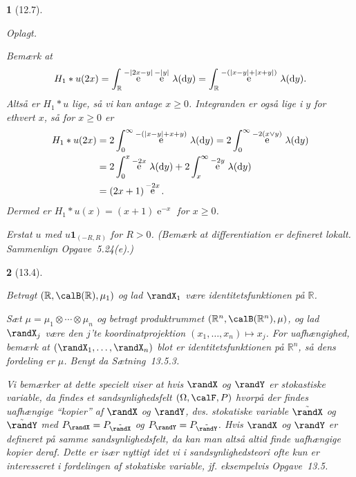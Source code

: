 \documentclass[a4paper, 11pt, article, danish, oneside]{memoir}
\newcommand{\reals}{\mathbb{R}}
\newcommand{\blank}{\mathrel{\;\cdot\;}}
\newcommand{\blankifempty}[1]{\ifstrempty{#1}{\blank}{#1}}
\DeclarePairedDelimiter{\auxdelimlvert}{\lvert}{\rvert}
\newcommand{\abs}[2][]{\auxdelimlvert[#1]{\blankifempty{#2}}}
\DeclarePairedDelimiter{\auxdelimparen}{(}{)}
\newcommand{\borel}[2][]{\calB\auxdelimparen[#1]{#2}}
\newcommand{\dif}{\mathop{}\!\mathrm{d}}
\newcommand{\indicator}[1]{\mathbf{1}_{#1}}
\newcommand{\join}{\lor}
\DeclareMathOperator{\e}{\mathrm{e}}
\newcommand{\pencilsymbol}{\raisebox{-2pt}{\normalfont\PencilLeft}}
\theoremstyle{changedotcustomnumber}
\theoremstyle{changedotbreakcustomnumber}
\newtheorem{opgavebreak}{\pencilsymbol}
\begin{document}
\begin{opgavebreak}[12.7]
\begin{solutionsec}
    \item Oplagt.

    \item Bemærk at
    \begin{equation*}
        H_1 * u(2x)
            = \int_\reals \e^{-\abs{2x-y}} \e^{-\abs{y}} \,\lambda(\dif y)
            = \int_\reals \e^{-(\abs{x-y}+\abs{x+y})} \,\lambda(\dif y).
    \end{equation*}
    Altså er $H_1 * u$ lige, så vi kan antage $x \geq 0$. Integranden er også lige i $y$ for ethvert $x$, så for $x \geq 0$ er
    \begin{align*}
        H_1 * u(2x)
            &= 2\int_0^\infty \e^{-(\abs{x-y}+x+y)} \,\lambda(\dif y)
             = 2\int_0^\infty \e^{-2(x \join y)} \,\lambda(\dif y) \\
            &= 2\int_0^x \e^{-2x} \,\lambda(\dif y) + 2\int_x^\infty \e^{-2y} \,\lambda(\dif y) \\
            &= (2x+1) \e^{-2x}.
    \end{align*}
    Dermed er $H_1 * u(x) = (x+1)\e^{-x}$ for $x \geq 0$.

    \item Erstat $u$ med $u \indicator{(-R,R)}$ for $R > 0$. (Bemærk at differentiation er defineret lokalt. Sammenlign Opgave~5.24(e).)
\end{solutionsec}
\end{opgavebreak}


\begin{opgavebreak}[13.4]
\begin{solutionsec}
    \item Betragt $(\reals,\borel{\reals},\mu_1)$ og lad $\randX_1$ være identitetsfunktionen på $\reals$.

    \item Sæt $\mu = \mu_1 \otimes \cdots \otimes \mu_n$ og betragt produktrummet $(\reals^n, \borel{\reals^n}, \mu)$, og lad $\randX_j$ være den $j$'te koordinatprojektion $(x_1, \ldots, x_n) \mapsto x_j$. For uafhængighed, bemærk at $(\randX_1, \ldots, \randX_n)$ blot er identitetsfunktionen på $\reals^n$, så dens fordeling er $\mu$. Benyt da Sætning~13.5.3.

    Vi bemærker at dette specielt viser at hvis $\randX$ og $\randY$ er stokastiske variable, da findes et sandsynlighedsfelt $(\Omega,\calF,P)$ hvorpå der findes uafhængige \enquote{kopier} af $\randX$ og $\randY$, dvs. stokatiske variable $\tilde{\randX}$ og $\tilde{\randY}$ med $P_\randX = P_{\tilde{\randX}}$ og $P_\randY = P_{\tilde{\randY}}$. Hvis $\randX$ og $\randY$ er defineret på samme sandsynlighedsfelt, da kan man altså altid finde \emph{uafhængige} kopier deraf. Dette er især nyttigt idet vi i sandsynlighedsteori ofte kun er interesseret i \emph{fordelingen} af stokatiske variable, jf. eksempelvis Opgave~13.5.
\end{solutionsec}
\end{opgavebreak}
\end{document}

